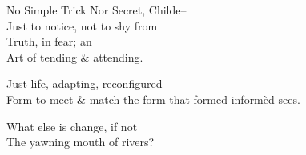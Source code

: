 No Simple Trick Nor Secret, Childe-- \\
Just to notice, not to shy from \\
Truth, in fear; an \\
Art of tending \& attending.

Just life, adapting, reconfigured \\
Form to meet \& match the form that formed informèd sees.

What else is change, if not \\
The yawning mouth of rivers?